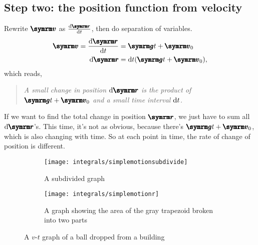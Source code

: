 \subsection{Step two: the position function from velocity}
Rewrite $\vv{v}$ as $\odv{\vv{r}}{t}$, then do separation of variables.
\begin{align}
    \vv{v} = \odv{\vv{r}}{t} &= \vv{g}t + \vv{v}_0 \label{eq:simplemotionr2} \\
    \odif{\vv{r}} &= \odif{t}(\vv{g}t + \vv{v}_0),\label{eq:simplemotionr3}
\end{align}
which reads,
\begin{quotation}
    \emph{A small change in position $\odif{\vv{r}}$ is the product of $\vv{g}t + \vv{v}_0$ and a small time interval $\odif{t}$.}
    \label{quote}
\end{quotation}
If we want to find the total change in position $\vv{r}$, we just have to sum all $\odif{\vv{r}}$'s. This time, it's not as obvious, because there's $\vv{g}t + \vv{v}_0$, which is also changing with time. So at each point in time, the rate of change of position is different.

\begin{figure}[ht]
    \centering
	\begin{subfigure}[c]{0.45\textwidth}
        \centering
        \texttt{[image: integrals/simplemotionsubdivide]}
        \caption{A subdivided graph}
        \label{fig:simplemotionsubdivided}
    \end{subfigure}
    \begin{subfigure}[c]{0.45\textwidth}
        \centering
        \texttt{[image: integrals/simplemotionr]}
        \caption{A graph showing the area of the gray trapezoid broken into two parts}
        \label{fig:simplemotionr}
    \end{subfigure}
    \caption{A $v$-$t$ graph of a ball dropped from a building}
\end{figure}

